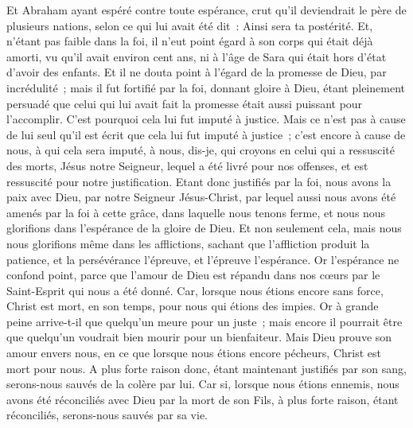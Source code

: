 \begin{multicols}{2}
Et Abraham ayant espéré contre toute espérance, crut qu'il deviendrait le père de plusieurs nations, selon ce qui lui avait été dit~: Ainsi sera ta postérité.
Et, n'étant pas faible dans la foi, il n'eut point égard à son corps qui était déjà amorti, vu qu'il avait environ cent ans, ni à l'âge de Sara qui était hors d'état d'avoir des enfants.
Et il ne douta point à l'égard de la promesse de Dieu, par incrédulité~; mais il fut fortifié par la foi, donnant gloire à Dieu,
étant pleinement persuadé que celui qui lui avait fait la promesse était aussi puissant pour l'accomplir.
C'est pourquoi cela lui fut imputé à justice.
Mais ce n'est pas à cause de lui seul qu'il est écrit que cela lui fut imputé à justice~;
c'est encore à cause de nous, à qui cela sera imputé, à nous, dis-je, qui croyons en celui qui a ressuscité des morts, Jésus notre Seigneur,
lequel a été livré pour nos offenses, et est ressuscité pour notre justification.
\VerseOne{}Etant donc justifiés par la foi, nous avons la paix avec Dieu, par notre Seigneur Jésus-Christ,
par lequel aussi nous avons été amenés par la foi à cette grâce, dans laquelle nous tenons ferme, et nous nous glorifions dans l'espérance de la gloire de Dieu.
Et non seulement cela, mais nous nous glorifions même dans les afflictions, sachant que l'affliction produit la patience,
et la persévérance l'épreuve, et l'épreuve l'espérance.
Or l'espérance ne confond point, parce que l'amour de Dieu est répandu dans nos cœurs par le Saint-Esprit qui nous a été donné.
Car, lorsque nous étions encore sans force, Christ est mort, en son temps, pour nous qui étions des impies.
Or à grande peine arrive-t-il que quelqu'un meure pour un juste~; mais encore il pourrait être que quelqu'un voudrait bien mourir pour un bienfaiteur.
Mais Dieu prouve son amour envers nous, en ce que lorsque nous étions encore pécheurs, Christ est mort pour nous.
A plus forte raison donc, étant maintenant justifiés par son sang, serons-nous sauvés de la colère par lui.
Car si, lorsque nous étions ennemis, nous avons été réconciliés avec Dieu par la mort de son Fils, à plus forte raison, étant réconciliés, serons-nous sauvés par sa vie.

\end{multicols}
